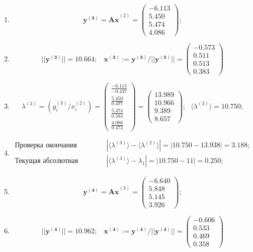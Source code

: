 \begin{enumerate}
\item $$
    \mathbf{y^{(3)} =Ax}^{(2)} = \begin{pmatrix}-6.113\\5.450\\5.474\\4.086\end{pmatrix};$$

\item $$
    ||\mathbf{y^{(3)}}|| = 10.664; ~~~~
    \mathbf{x^{(3)}}:=\mathbf{y^{(3)}}/||\mathbf{y^{(3)}}|| =
    \begin{pmatrix}-0.573\\0.511\\0.513\\0.383\end{pmatrix}$$

\item $$
    \lambda^{(3)} =\left( y^{(3)}_i / x^{(2)}_i \right) =
    \begin{pmatrix} \frac{-6.113}{-0.437}\\\frac{ 5.450}{0.497}\\\frac{5.474}{0.583}\\\frac{4.086}{0.472}\end{pmatrix}=
    \begin{pmatrix}13.989\\10.966\\9.389\\8.657\end{pmatrix}; ~~~
    \langle\lambda^{(3)}\rangle = 10.750;$$

\item $$
    \begin{matrix}
        \text{Проверка окончания алгоритма: }&|\langle\lambda^{(3)}\rangle - \langle\lambda^{(2)}\rangle| = |10.750-13.938| =    \mathbf{3.188};\\
        \text{Текущая абсолютная ошибка: }&|\langle\lambda^{(3)}\rangle - \lambda_1| = |10.750 - 11| = \mathbf{0.250};
    \end{matrix}$$




\item $$
\mathbf{y^{(4)} =Ax}^{(3)} = \begin{pmatrix}-6.640\\5.848\\5.145\\3.926\end{pmatrix};$$

\item $$
    ||\mathbf{y^{(4)}}|| = 10.962; ~~~~
    \mathbf{x^{(4)}}:=\mathbf{y^{(4)}}/||\mathbf{y^{(4)}}|| =
    \begin{pmatrix} -0.606\\0.533\\0.469\\0.358\end{pmatrix}$$


\end{enumerate}
